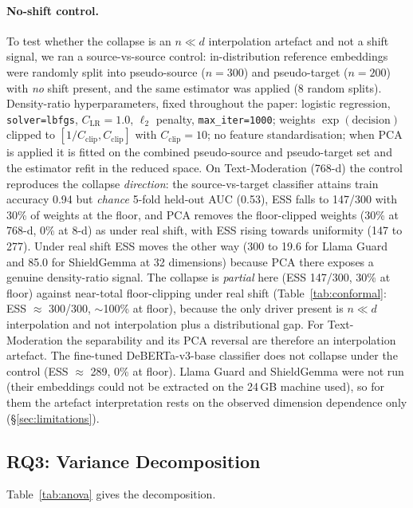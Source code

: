 \documentclass{article}
\begin{document}
\paragraph{No-shift control.} To test whether the collapse is an $n \ll d$ interpolation artefact and not a shift signal, we ran a source-vs-source control: in-distribution reference embeddings were randomly split into pseudo-source ($n{=}300$) and pseudo-target ($n{=}200$) with \emph{no} shift present, and the same estimator was applied (8 random splits). Density-ratio hyperparameters, fixed throughout the paper: logistic regression, \texttt{solver=lbfgs}, $C_{\text{LR}}{=}1.0$, $\ell_2$ penalty, \texttt{max\_iter=1000}; weights $\exp(\text{decision})$ clipped to $[1/C_{\text{clip}}, C_{\text{clip}}]$ with $C_{\text{clip}}{=}10$; no feature standardisation; when PCA is applied it is fitted on the combined pseudo-source and pseudo-target set and the estimator refit in the reduced space. On Text-Moderation (768-d) the control reproduces the collapse \emph{direction}: the source-vs-target classifier attains train accuracy 0.94 but \emph{chance} 5-fold held-out AUC (0.53), ESS falls to 147/300 with 30\% of weights at the floor, and PCA removes the floor-clipped weights (30\% at 768-d, 0\% at 8-d) as under real shift, with ESS rising towards uniformity (147 to 277). Under real shift ESS moves the other way (300 to 19.6 for Llama Guard and 85.0 for ShieldGemma at 32 dimensions) because PCA there exposes a genuine density-ratio signal. The collapse is \emph{partial} here (ESS 147/300, 30\% at floor) against near-total floor-clipping under real shift (Table~\ref{tab:conformal}: ESS ${\approx}$ 300/300, ${\sim}$100\% at floor), because the only driver present is $n \ll d$ interpolation and not interpolation plus a distributional gap. For Text-Moderation the separability and its PCA reversal are therefore an interpolation artefact. The fine-tuned DeBERTa-v3-base classifier does not collapse under the control (ESS $\approx$ 289, 0\% at floor). Llama Guard and ShieldGemma were not run (their embeddings could not be extracted on the 24\,GB machine used), so for them the artefact interpretation rests on the observed dimension dependence only (\S\ref{sec:limitations}).

\subsection{RQ3: Variance Decomposition}
\label{sec:variance}

Table~\ref{tab:anova} gives the decomposition.
\end{document}
